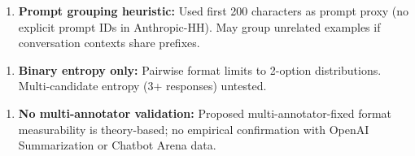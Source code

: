 \begin{enumerate}
\item \textbf{Prompt grouping heuristic:} Used first 200 characters as prompt proxy (no explicit prompt IDs in Anthropic-HH). May group unrelated examples if conversation contexts share prefixes.
\end{enumerate}

\begin{enumerate}
\item \textbf{Binary entropy only:} Pairwise format limits to 2-option distributions. Multi-candidate entropy (3+ responses) untested.
\end{enumerate}

\begin{enumerate}
\item \textbf{No multi-annotator validation:} Proposed multi-annotator-fixed format measurability is theory-based; no empirical confirmation with OpenAI Summarization or Chatbot Arena data.
\end{enumerate}

